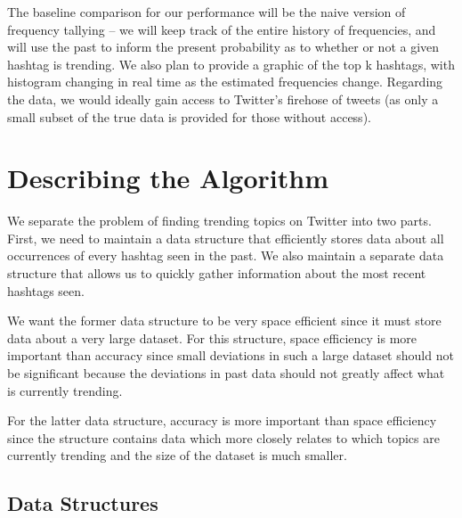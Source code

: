 \documentclass[twoside]{article}
\begin{document}
\begin{multicols}{2}
The baseline comparison for our performance will be the naive version of frequency tallying -- we will keep track of the entire history of frequencies, and will use the past to inform the present probability as to whether or not a given hashtag is trending. We also plan to provide a graphic of the top k hashtags, with histogram changing in real time as the estimated frequencies change. Regarding the data, we would ideally gain access to Twitter's firehose of tweets (as only a small subset of the true data is provided for those without access). 

\section{Describing the Algorithm}


We separate the problem of finding trending topics on Twitter into two parts.  First, we need to maintain a data structure that efficiently stores data about all occurrences of every hashtag seen in the past.  We also maintain a separate data structure that allows us to quickly gather information about the most recent hashtags seen.

We want the former data structure to be very space efficient since it must store data about a very large dataset.  For this structure, space efficiency is more important than accuracy since small deviations in such a large dataset should not be significant because the deviations in past data should not greatly affect what is currently trending.

For the latter data structure, accuracy is more important than space efficiency since the structure contains data which more closely relates to which topics are currently trending and the size of the dataset is much smaller.


\subsection{Data Structures}

\end{multicols}
\end{document}
